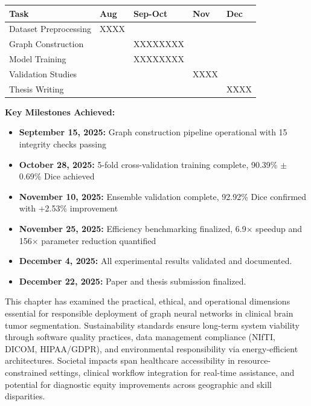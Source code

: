 \begin{center}
\begin{tabularx}{\textwidth} { 
  | >{\raggedright\arraybackslash}X 
  | >{\centering\arraybackslash}X 
  | >{\centering\arraybackslash}X 
  | >{\centering\arraybackslash}X 
  | >{\centering\arraybackslash}X 
  | }
\hline
\textbf{Task} & \textbf{Aug} & \textbf{Sep-Oct} & \textbf{Nov} & \textbf{Dec}\\
\hline
Dataset Preprocessing & \cellcolor{gray!30}XXXX & & &\\
\hline
Graph Construction & & \cellcolor{gray!30}XXXXXXXX & &\\
\hline
Model Training & & \cellcolor{gray!30}XXXXXXXX & &\\
\hline
Validation Studies & & & \cellcolor{gray!30}XXXX &\\
\hline
Thesis Writing & & & & \cellcolor{gray!30}XXXX\\
\hline
\end{tabularx}
\end{center}

\textbf{Key Milestones Achieved:}
\begin{itemize}
    \item \textbf{September 15, 2025:} Graph construction pipeline operational with 15 integrity checks passing
    \item \textbf{October 28, 2025:} 5-fold cross-validation training complete, 90.39\% $\pm$ 0.69\% Dice achieved
    \item \textbf{November 10, 2025:} Ensemble validation complete, 92.92\% Dice confirmed with +2.53\% improvement
    \item \textbf{November 25, 2025:} Efficiency benchmarking finalized, 6.9$\times$ speedup and 156$\times$ parameter reduction quantified
    \item \textbf{December 4, 2025:} All experimental results validated and documented.
    \item \textbf{December 22, 2025:} Paper and thesis submission finalized.
\end{itemize}

\vspace{5mm}

This chapter has examined the practical, ethical, and operational dimensions essential for responsible deployment of graph neural networks in clinical brain tumor segmentation. Sustainability standards ensure long-term system viability through software quality practices, data management compliance (NIfTI, DICOM, HIPAA/GDPR), and environmental responsibility via energy-efficient architectures. Societal impacts span healthcare accessibility in resource-constrained settings, clinical workflow integration for real-time assistance, and potential for diagnostic equity improvements across geographic and skill disparities.

